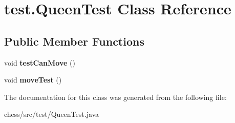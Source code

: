 \hypertarget{classtest_1_1_queen_test}{}\section{test.\+Queen\+Test Class Reference}
\label{classtest_1_1_queen_test}
\subsection*{Public Member Functions}
\begin{DoxyCompactItemize}
\item 
\mbox{\label{classtest_1_1_queen_test_a71f25b88220441751889311045aaa8b1}} 
void {\bfseries test\+Can\+Move} ()
\item 
\mbox{\label{classtest_1_1_queen_test_a8b42fba9b9b4d344791c8e2ae002f65c}} 
void {\bfseries move\+Test} ()
\end{DoxyCompactItemize}


The documentation for this class was generated from the following file\+:\begin{DoxyCompactItemize}
\item 
chess/src/test/Queen\+Test.\+java\end{DoxyCompactItemize}
